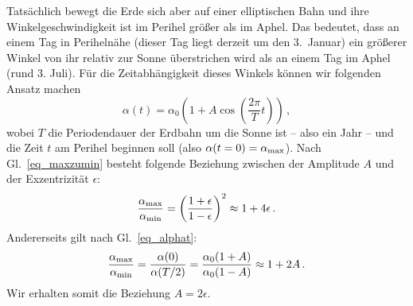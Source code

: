 Tats\"achlich bewegt die Erde sich aber auf einer elliptischen Bahn und ihre Winkelgeschwindigkeit
ist im Perihel gr\"o\ss er als im Aphel. Das bedeutet, dass an einem Tag in Periheln\"ahe (dieser Tag
liegt derzeit um den 3.\ Januar) ein gr\"o\ss erer Winkel von ihr relativ zur Sonne \"uberstrichen wird
als an einem Tag im Aphel (rund 3. Juli). F\"ur die Zeitabh\"angigkeit dieses Winkels k\"onnen wir
folgenden Ansatz machen
\begin{equation}
\label{eq_alphat}
                \alpha(t) = \alpha_0 \left( 1 + A \cos \left( \frac{2\pi}{T} t \right) \right)  \, , 
\end{equation} 
wobei $T$ die Periodendauer der Erdbahn um die Sonne ist -- also ein Jahr --
und die Zeit $t$ am Perihel beginnen soll (also $\alpha(t=0)=\alpha_{\rm max}$). 
Nach Gl.\ \ref{eq_maxzumin} besteht folgende Beziehung zwischen der Amplitude $A$ und
der Exzentrizit\"at $\epsilon$: 
\begin{equation}
               \frac{\alpha_{\rm max}}{\alpha_{\rm min}} = \left( \frac{  1 + \epsilon}{1-\epsilon} \right)^2
              \approx 1+4\epsilon  \, . 
\end{equation} 
Andererseits gilt nach Gl.\ \ref{eq_alphat}:
\begin{equation}
               \frac{\alpha_{\rm max}}{\alpha_{\rm min}} =
            \frac{\alpha(0)}{\alpha(T/2)} = \frac{ \alpha_0 ( 1 + A )}{\alpha_0(1-A)} 
            \approx 1 + 2A  \, . 
\end{equation} 
Wir erhalten somit die Beziehung $A = 2 \epsilon$. 


